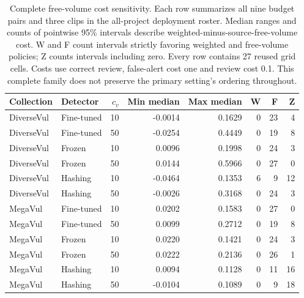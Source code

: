 \begin{table}[H]\centering\small
\caption{Complete free-volume cost sensitivity. Each row summarizes all nine budget pairs and three clips in the all-project deployment roster. Median ranges and counts of pointwise 95\% intervals describe weighted-minus-source-free-volume cost. W and F count intervals strictly favoring weighted and free-volume policies; Z counts intervals including zero. Every row contains 27 reused grid cells. Costs use correct review, false-alert cost one and review cost 0.1. This complete family does not preserve the primary setting's ordering throughout.}
\label{si:costgrid}
\begin{tabular}{@{}llrrrrrr@{}}\toprule Collection & Detector & $c_v$ & Min median & Max median & W & F & Z\\\midrule
DiverseVul & Fine-tuned & 10 & -0.0014 & 0.1629 & 0 & 23 & 4\\
DiverseVul & Fine-tuned & 50 & -0.0254 & 0.4449 & 0 & 19 & 8\\
DiverseVul & Frozen & 10 & 0.0096 & 0.1998 & 0 & 24 & 3\\
DiverseVul & Frozen & 50 & 0.0144 & 0.5966 & 0 & 27 & 0\\
DiverseVul & Hashing & 10 & -0.0464 & 0.1353 & 6 & 9 & 12\\
DiverseVul & Hashing & 50 & -0.0026 & 0.3168 & 0 & 24 & 3\\
MegaVul & Fine-tuned & 10 & 0.0202 & 0.1583 & 0 & 27 & 0\\
MegaVul & Fine-tuned & 50 & 0.0099 & 0.2712 & 0 & 19 & 8\\
MegaVul & Frozen & 10 & 0.0220 & 0.1421 & 0 & 24 & 3\\
MegaVul & Frozen & 50 & 0.0222 & 0.2136 & 0 & 26 & 1\\
MegaVul & Hashing & 10 & 0.0094 & 0.1128 & 0 & 11 & 16\\
MegaVul & Hashing & 50 & -0.0104 & 0.1089 & 0 & 9 & 18\\
\bottomrule\end{tabular}\end{table}
